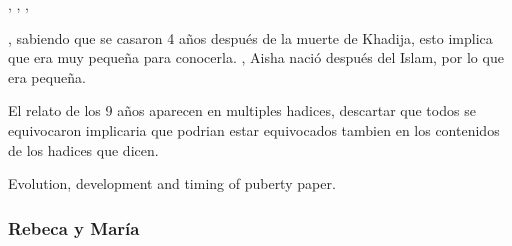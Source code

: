 \documentclass[12pt]{report}
\begin{document}
	\begin{minibloque}[Crítica]
		, , , 
	\end{minibloque}
	
	\begin{minibloque}
		
	\end{minibloque}
	
	\begin{subminibloque}[Dúplica 1]
		, sabiendo que se casaron 4 años después de la muerte de Khadija, esto implica que era muy pequeña para conocerla. , Aisha nació después del Islam, por lo que era pequeña.
		
		El relato de los 9 años aparecen en multiples hadices, descartar que todos se equivocaron implicaria que podrian estar equivocados tambien en los contenidos de los hadices que dicen.
	\end{subminibloque}
	
	\begin{minibloque}
		
	\end{minibloque}
	
	\begin{subminibloque}[Dúplica 2]
		Evolution, development and timing of puberty paper.
	\end{subminibloque}
	
	\begin{minibloque}
		
	\end{minibloque}
	
	\begin{subminibloque}[Dúplica 3]
		
	\end{subminibloque}
	 
	
	\subsubsection{Rebeca y María}
	
\end{document}
